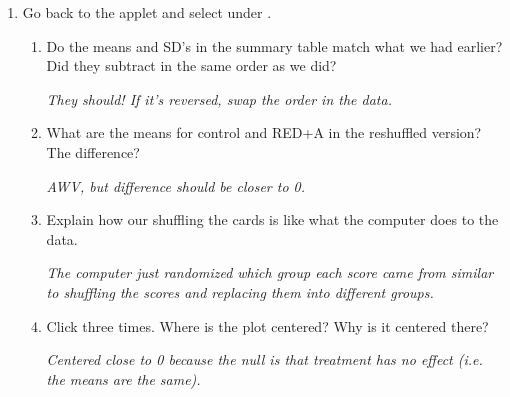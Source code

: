 \begin{enumerate}
 \item  Go back to the applet and select  under .
   \begin{enumerate}
   \item 
   Do the means and SD's in the summary table match what we had
   earlier?  Did they subtract in the same order as we did?
\begin{students}
    \vspace{1cm}    
\end{students}

\begin{key}
  {\it  They should! If it's reversed, swap the order in the data.}
\end{key}

    \item  What are the means for control and RED+A in the
      reshuffled version?  The difference?
\begin{students}
    \vspace{1cm}    
\end{students}

\begin{key}
  {\it  AWV, but difference should be closer to 0.}
\end{key}



 \item Explain how our shuffling the cards is like what the computer does to
   the data.
\begin{students}
    \vspace{3cm}    
\end{students}

\begin{key}
  {\it  The computer just randomized which group each score came from
   similar to shuffling the scores and replacing them into different
   groups.  }
\end{key}

 \item Click    three times.  Where is the plot
   centered?   Why is it centered there?
\begin{students}
    \vspace{2cm}    
\end{students}

\begin{key}
  {\it     Centered close to 0 because the null is that treatment has no
   effect (i.e. the means are the same). }
\end{key}



\end{enumerate}
\end{enumerate}
